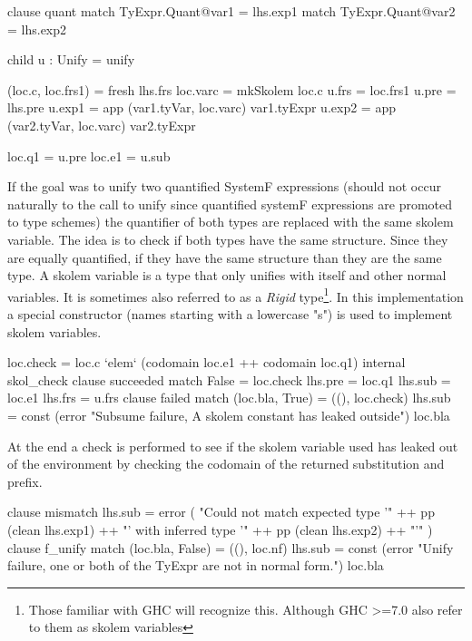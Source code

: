 \begin{code}
   clause quant
     match TyExpr.Quant@var1 = lhs.exp1
     match TyExpr.Quant@var2 = lhs.exp2
     
     child u : Unify = unify
     
     (loc.c, loc.frs1) = fresh lhs.frs
     loc.varc = mkSkolem loc.c
     u.frs  = loc.frs1
     u.pre  = lhs.pre
     u.exp1 = app (var1.tyVar, loc.varc) var1.tyExpr
     u.exp2 = app (var2.tyVar, loc.varc) var2.tyExpr
     
     loc.q1 = u.pre
     loc.e1 = u.sub
\end{code}
If the goal was to unify two quantified SystemF expressions (should not occur naturally to the call to unify since quantified systemF expressions are promoted to type schemes) the quantifier of both types are replaced with the same skolem variable. The idea is to check if both types have the same structure. Since they are equally quantified, if they have the same structure than they are the same type.
A skolem variable is a type that only unifies with itself and other normal variables. It is sometimes also referred to as a \emph{Rigid} type\footnote{Those familiar with GHC will recognize this. Although GHC >=7.0 also refer to them as skolem variables}. In this implementation a special constructor (names starting with a lowercase "s") is used to implement skolem variables.
\begin{code}                       
   loc.check = loc.c `elem` (codomain loc.e1 ++ codomain loc.q1)
   internal skol_check
      clause succeeded
        match False  = loc.check
        lhs.pre = loc.q1
        lhs.sub = loc.e1
        lhs.frs = u.frs
      clause failed
        match (loc.bla, True) = ((), loc.check)
        lhs.sub = const (error "Subsume failure, A skolem constant has leaked outside") loc.bla
\end{code}
At the end a check is performed to see if the skolem variable used has leaked out of the environment by checking the codomain of the returned substitution and prefix.

\begin{code}
       clause mismatch
         lhs.sub = error (  "Could not match expected type '" 
                          ++ pp (clean lhs.exp1) ++ "' with inferred type '" 
                          ++ pp (clean lhs.exp2) ++ "'" )
   clause f_unify
     match (loc.bla, False) = ((), loc.nf)
     lhs.sub = const (error "Unify failure, one or both of the TyExpr are not in normal form.") loc.bla
\end{code}

